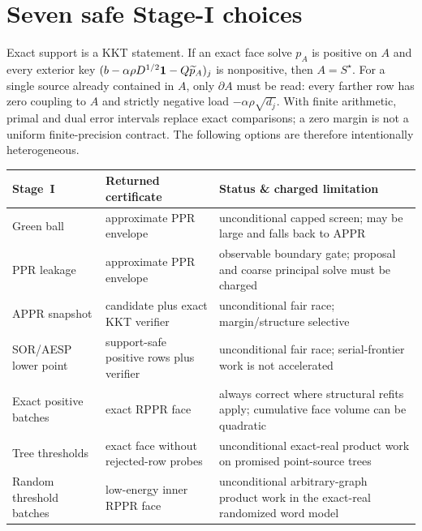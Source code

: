 \section{Seven safe Stage-I choices}

Exact support is a KKT statement.  If an exact face solve $p_A$ is positive
on $A$ and every exterior key
$(b-\alpha\rho D^{1/2}\mathbf{1}-Q\widetilde p_A)_j$ is nonpositive, then
$A=S^\star$.  For a single source already contained in $A$, only
$\partial A$ must be read: every farther row has zero coupling to $A$ and
strictly negative load $-\alpha\rho\sqrt{d_j}$.  With finite arithmetic,
primal and dual error intervals replace exact comparisons; a zero margin is
not a uniform finite-precision contract.
The following options are therefore intentionally heterogeneous.

\begin{center}
\small
\begin{tabularx}{\textwidth}{@{}
  >{\raggedright\arraybackslash}p{}
  >{\raggedright\arraybackslash}p{}
  >{\raggedright\arraybackslash}X@{}}
\toprule
Stage~I & Returned certificate & Status \& charged limitation \\
\midrule
Green ball & approximate PPR envelope & unconditional capped screen; may be
large and falls back to APPR \\
PPR leakage & approximate PPR envelope & observable boundary gate; proposal
and coarse principal solve must be charged \\
APPR snapshot & candidate plus exact KKT verifier & unconditional fair race;
margin/structure selective \\
SOR/AESP lower point & support-safe positive rows plus verifier & unconditional
fair race; serial-frontier work is not accelerated \\
Exact positive batches & exact RPPR face & always correct where structural
refits apply; cumulative face volume can be quadratic \\
Tree thresholds & exact face without rejected-row probes & unconditional
exact-real product work on promised point-source trees \\
Random threshold batches & low-energy inner RPPR face & unconditional
arbitrary-graph product work in the exact-real randomized word model \\
\bottomrule
\end{tabularx}
\end{center}

